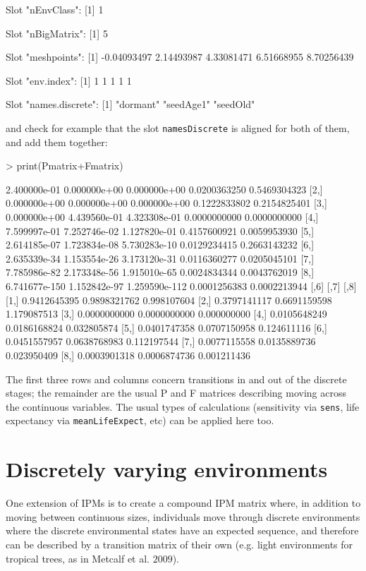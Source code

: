 \documentclass{article}
\begin{document}
\begin{Schunk}
\begin{Soutput}
Slot "nEnvClass":
[1] 1

Slot "nBigMatrix":
[1] 5

Slot "meshpoints":
[1] -0.04093497  2.14493987  4.33081471  6.51668955  8.70256439

Slot "env.index":
[1] 1 1 1 1 1

Slot "names.discrete":
[1] "dormant"  "seedAge1" "seedOld" 
\end{Soutput}
\end{Schunk}
and check for example that the slot {\tt namesDiscrete} is aligned for both of them, and add
them together:
\begin{Schunk}
\begin{Sinput}
> print(Pmatrix+Fmatrix)
\end{Sinput}
\begin{Soutput}
              [,1]         [,2]          [,3]         [,4]         [,5]
[1,]  2.400000e-01 0.000000e+00  0.000000e+00 0.0200363250 0.5469304323
[2,]  0.000000e+00 0.000000e+00  0.000000e+00 0.1222833802 0.2154825401
[3,]  0.000000e+00 4.439560e-01  4.323308e-01 0.0000000000 0.0000000000
[4,]  7.599997e-01 7.252746e-02  1.127820e-01 0.4157600921 0.0059953930
[5,]  2.614185e-07 1.723834e-08  5.730283e-10 0.0129234415 0.2663143232
[6,]  2.635339e-34 1.153554e-26  3.173120e-31 0.0116360277 0.0205045101
[7,]  7.785986e-82 2.173348e-56  1.915010e-65 0.0024834344 0.0043762019
[8,] 6.741677e-150 1.152842e-97 1.259590e-112 0.0001256383 0.0002213944
             [,6]         [,7]        [,8]
[1,] 0.9412645395 0.9898321762 0.998107604
[2,] 0.3797141117 0.6691159598 1.179087513
[3,] 0.0000000000 0.0000000000 0.000000000
[4,] 0.0105648249 0.0186168824 0.032805874
[5,] 0.0401747358 0.0707150958 0.124611116
[6,] 0.0451557957 0.0638768983 0.112197544
[7,] 0.0077115558 0.0135889736 0.023950409
[8,] 0.0003901318 0.0006874736 0.001211436
\end{Soutput}
\end{Schunk}
The first three rows and columns concern transitions in and out of the discrete stages; the remainder are the usual P and F matrices describing moving across the continuous variables. The usual types of calculations (sensitivity via {\tt sens}, life expectancy via {\tt meanLifeExpect}, etc) can be applied here too.    

\section{Discretely varying environments}
One extension of IPMs is to create a compound IPM matrix where, in addition to
moving between continuous sizes, individuals move through discrete environments where the discrete environmental states have an expected sequence, and therefore can be described by a transition matrix of their own (e.g. light environments for tropical trees, as in Metcalf et al. $2009$).
\end{document}
